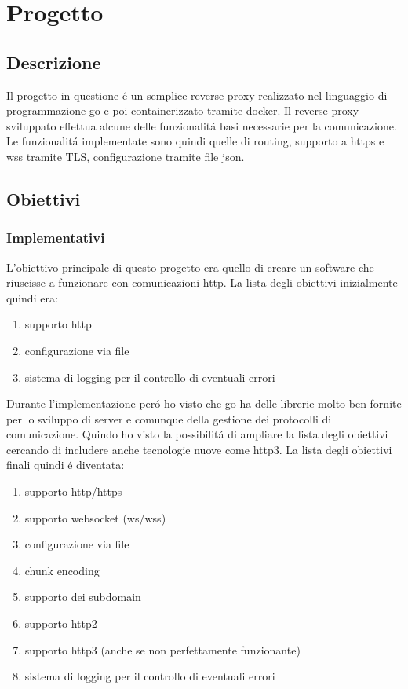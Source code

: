 \chapter{Progetto}
\label{cha:Progetto}

\section{Descrizione}
Il progetto in questione é un semplice reverse proxy realizzato nel linguaggio di programmazione go e poi containerizzato tramite docker. Il reverse proxy sviluppato effettua alcune delle funzionalitá basi necessarie per la comunicazione. Le funzionalitá implementate sono quindi quelle di routing, supporto a https e wss tramite TLS, configurazione tramite file json.

\section{Obiettivi}
\subsection{Implementativi}
L'obiettivo principale di questo progetto era quello di creare un software che riuscisse a funzionare con comunicazioni http. La lista degli obiettivi inizialmente quindi era:
\begin{enumerate}
  \item supporto http
  \item configurazione via file
  \item sistema di logging per il controllo di eventuali errori
\end{enumerate}
Durante l'implementazione peró ho visto che go ha delle librerie molto ben fornite per lo sviluppo di server e comunque della gestione dei protocolli di comunicazione. Quindo ho visto la possibilitá di ampliare la lista degli obiettivi cercando di includere anche tecnologie nuove come http3. La lista degli obiettivi finali quindi é diventata:
\begin{enumerate}
  \item supporto http/https
  \item supporto websocket (ws/wss)
  \item configurazione via file
  \item chunk encoding
  \item supporto dei subdomain
  \item supporto http2
  \item supporto http3 (anche se non perfettamente funzionante)
  \item sistema di logging per il controllo di eventuali errori
\end{enumerate}

